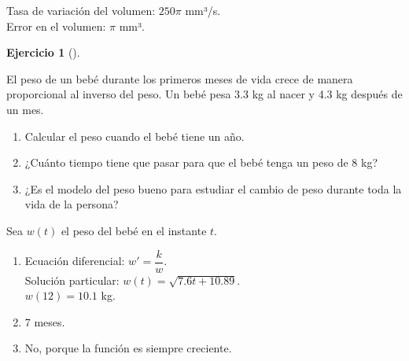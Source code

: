 \documentclass[
  a4paper,
]{scrreport}
\providecommand{\tightlist}{%
  \setlength{\itemsep}{0pt}\setlength{\parskip}{0pt}}\usepackage{longtable,booktabs,array}
\theoremstyle{definition}
\newtheorem{exercise}{Ejercicio}[chapter]
\theoremstyle{remark}
\begin{document}
\begin{tcolorbox}[enhanced jigsaw, opacitybacktitle=0.6, titlerule=0mm, bottomtitle=1mm, toptitle=1mm, breakable, bottomrule=.15mm, left=2mm, opacityback=0, toprule=.15mm, leftrule=.75mm, colframe=quarto-callout-tip-color-frame, coltitle=black, rightrule=.15mm, colback=white, title=\textcolor{quarto-callout-tip-color}{\faLightbulb}\hspace{0.5em}{Solución}, arc=.35mm, colbacktitle=quarto-callout-tip-color!10!white]

Tasa de variación del volumen: \(250\pi\) mm³/s.\\
Error en el volumen: \(\pi\) mm³.

\end{tcolorbox}

\begin{exercise}[]\protect\hypertarget{exr-2}{}\label{exr-2}

El peso de un bebé durante los primeros meses de vida crece de manera
proporcional al inverso del peso. Un bebé pesa 3.3 kg al nacer y 4.3 kg
después de un mes.

\begin{enumerate}
\def\labelenumi{\arabic{enumi}.}
\item
  Calcular el peso cuando el bebé tiene un año.
\item
  ¿Cuánto tiempo tiene que pasar para que el bebé tenga un peso de 8 kg?
\item
  ¿Es el modelo del peso bueno para estudiar el cambio de peso durante
  toda la vida de la persona?
\end{enumerate}

\end{exercise}

\begin{tcolorbox}[enhanced jigsaw, opacitybacktitle=0.6, titlerule=0mm, bottomtitle=1mm, toptitle=1mm, breakable, bottomrule=.15mm, left=2mm, opacityback=0, toprule=.15mm, leftrule=.75mm, colframe=quarto-callout-tip-color-frame, coltitle=black, rightrule=.15mm, colback=white, title=\textcolor{quarto-callout-tip-color}{\faLightbulb}\hspace{0.5em}{Solución}, arc=.35mm, colbacktitle=quarto-callout-tip-color!10!white]

Sea \(w(t)\) el peso del bebé en el instante \(t\).

\begin{enumerate}
\def\labelenumi{\arabic{enumi}.}
\tightlist
\item
  Ecuación diferencial: \(w'=\dfrac{k}{w}\).\\
  Solución particular: \(w(t)=\sqrt{7.6t+10.89}\).\\
  \(w(12)=10.1\) kg.
\item
  7 meses.
\item
  No, porque la función es siempre creciente.
\end{enumerate}

\end{tcolorbox}
\end{document}
